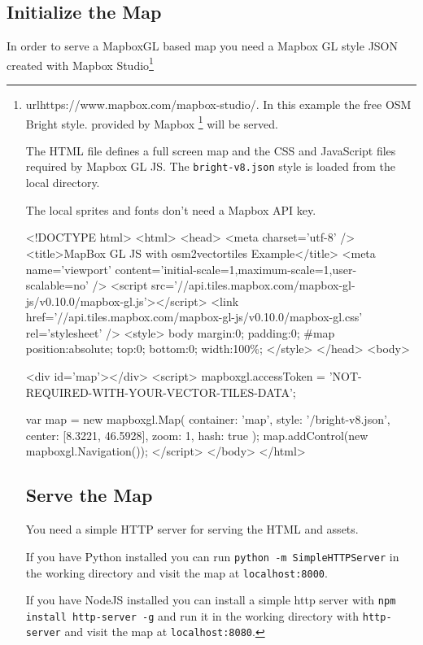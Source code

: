 \subsection*{Initialize the Map}\label{initialize-the-map}

In order to serve a MapboxGL based map you need a Mapbox GL style
JSON created with  
Mapbox Studio\footnote{url{https://www.mapbox.com/mapbox-studio/}.
In this example the free OSM Bright style.
provided by Mapbox \footnote{\url{https://github.com/mapbox/mapbox-gl-styles}} will be served.

The HTML file defines a full screen map and the CSS and JavaScript files
required by Mapbox GL JS. The \texttt{bright-v8.json} style is loaded
from the local directory.

The local sprites and fonts don't need a Mapbox API key.

\begin{htmlcode}
<!DOCTYPE html>
<html>
<head>
    <meta charset='utf-8' />
    <title>MapBox GL JS with osm2vectortiles Example</title>
    <meta name='viewport' content='initial-scale=1,maximum-scale=1,user-scalable=no' />
    <script src='//api.tiles.mapbox.com/mapbox-gl-js/v0.10.0/mapbox-gl.js'></script>
    <link href='//api.tiles.mapbox.com/mapbox-gl-js/v0.10.0/mapbox-gl.css' rel='stylesheet' />
    <style>
        body { margin:0; padding:0; }
        #map { position:absolute; top:0; bottom:0; width:100\%; }
    </style>
</head>
<body>

<div id='map'></div>
<script>
mapboxgl.accessToken = 'NOT-REQUIRED-WITH-YOUR-VECTOR-TILES-DATA';

var map = new mapboxgl.Map({
    container: 'map',
    style: '/bright-v8.json',
    center: [8.3221, 46.5928],
    zoom: 1,
    hash: true
});
map.addControl(new mapboxgl.Navigation());
</script>
</body>
</html>
\end{htmlcode}

\subsection*{Serve the Map}

You need a simple HTTP server for serving the HTML and assets.

If you have Python installed you can run \texttt{python -m SimpleHTTPServer} in the working directory and visit the map at \texttt{localhost:8000}.

If you have NodeJS installed you can install a simple http server with \texttt{npm install http-server -g} and run it in the working directory with \texttt{http-server} and visit the map at \texttt{localhost:8080}.

}
